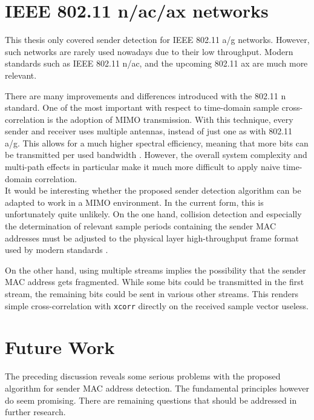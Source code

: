 
\section{IEEE 802.11 n/ac/ax networks}\label{sec:mimo}

This thesis only covered sender detection for IEEE 802.11 a/g networks. However, such networks are rarely used nowadays due to their low throughput. Modern standards such as IEEE 802.11 n/ac, and the upcoming 802.11 ax are much more relevant.

There are many improvements and differences introduced with the 802.11 n standard. One of the most important with respect to time-domain sample cross-correlation is the adoption of \gls{MIMO} transmission. With this technique, every sender and receiver uses multiple antennas, instead of just one as with 802.11 a/g. This allows for a much higher spectral efficiency, meaning that more bits can be transmitted per used bandwidth \cite{ieee2012}. However, the overall system complexity and multi-path effects in particular make it much more difficult to apply naive time-domain correlation.\\

It would be interesting whether the proposed sender detection algorithm can be adapted to work in a \gls{MIMO} environment. In the current form, this is unfortunately quite unlikely. On the one hand, collision detection and especially the determination of relevant sample periods containing the sender MAC addresses must be adjusted to the physical layer high-throughput frame format used by modern standards \cite{ieee2012}.

On the other hand, using multiple streams implies the possibility that the sender MAC address gets fragmented. While some bits could be transmitted in the first stream, the remaining bits could be sent in various other streams. This renders simple cross-correlation with \texttt{xcorr} directly on the received sample vector useless.



\section{Future Work}

The preceding discussion reveals some serious problems with the proposed algorithm for sender MAC address detection. The fundamental principles however do seem promising. There are remaining questions that should be addressed in further research.\\

